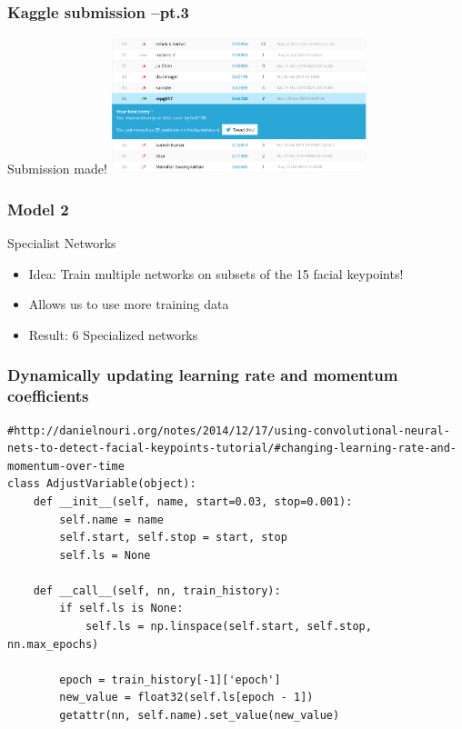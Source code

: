 \documentclass{beamer}
\begin{document}
\begin{frame}[fragile]
\frametitle{Kaggle submission --pt.3}
\begin{block}{Submission made!}
\includegraphics[width=280px,height=150px]{net1_kaggle_submission_score.png}
\end{block}
\end{frame}



\begin{frame}[fragile]
\frametitle{Model 2}
\begin{block}{Specialist Networks}
\begin{itemize}
\item Idea: Train multiple networks on subsets of the 15 facial keypoints!
\item Allows us to use more training data
\item Result: 6 Specialized networks
\end{itemize}
\end{block}
\end{frame}

\begin{frame}[fragile]
\frametitle{Dynamically updating learning rate and momentum coefficients }
\begin{verbatim}
#http://danielnouri.org/notes/2014/12/17/using-convolutional-neural-nets-to-detect-facial-keypoints-tutorial/#changing-learning-rate-and-momentum-over-time
class AdjustVariable(object):
    def __init__(self, name, start=0.03, stop=0.001):
        self.name = name
        self.start, self.stop = start, stop
        self.ls = None

    def __call__(self, nn, train_history):
        if self.ls is None:
            self.ls = np.linspace(self.start, self.stop, nn.max_epochs)

        epoch = train_history[-1]['epoch']
        new_value = float32(self.ls[epoch - 1])
        getattr(nn, self.name).set_value(new_value)
\end{verbatim}
\end{frame}
\end{document}
